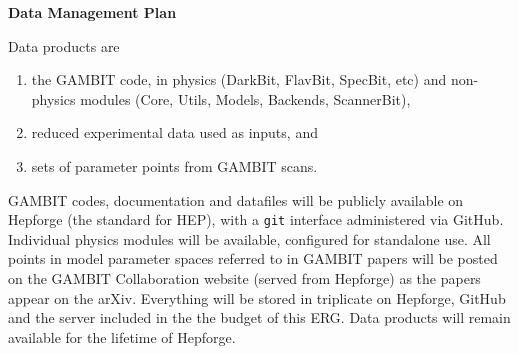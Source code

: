 \documentclass[11pt,oneside,onecolumn,a4paper]{article}
\author{Pat Scott}
\date{}
\begin{document}
\thispagestyle{fancy}

\centerline{\LARGE \textbf{Data Management Plan}}\bigskip 

\noindent Data products are
\begin{enumerate}
\item the GAMBIT code, in physics (DarkBit, FlavBit, SpecBit, etc) and non-physics modules (Core, Utils, Models, Backends, ScannerBit),
\item reduced experimental data used as inputs, and
\item sets of parameter points from GAMBIT scans.
\end{enumerate}

\vspace{3mm}\noindent GAMBIT codes, documentation and datafiles will be publicly available on Hepforge (the standard for HEP), with a \texttt{git} interface administered via GitHub.  Individual physics modules will be available, configured for standalone use.  All points in model parameter spaces referred to in GAMBIT papers will be posted on the GAMBIT Collaboration website (served from Hepforge) as the papers appear on the arXiv.  Everything will be stored in triplicate on Hepforge, GitHub and the server included in the the budget of this ERG.  Data products will remain available for the lifetime of Hepforge.
\end{document}

